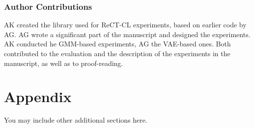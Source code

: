 \documentclass{article} %
\begin{document}
\subsubsection*{Author Contributions}
AK created the library used for ReCT-CL experiments, based on earlier code by AG. AG wrote a significant part of the manuscript and designed the experiments. AK conducted he GMM-based experiments, AG the VAE-based ones. Both contributed to the evaluation and the description of the experiments in the manuscript, as well as to proof-reading.
%
%



\appendix
\section{Appendix}
You may include other additional sections here.
\end{document}

